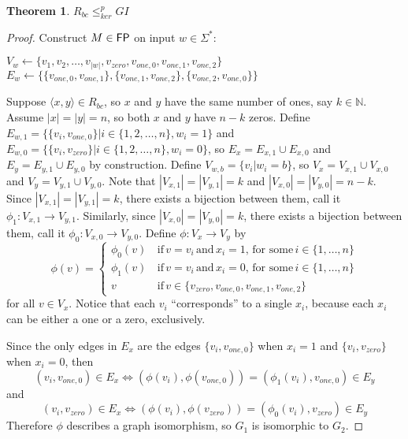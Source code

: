 \documentclass{article}
\newtheorem{theorem}{Theorem}[section]
\theoremstyle{definition} \newtheorem{definition}[definition]{Definition}
\newcommand{\plain}[1]{\,\text{#1}\,} %
\newcommand{\sigmastar}{\Sigma^{*}} %
\newcommand{\kr}{\leq^{p}_{ker}} %
\newcommand{\pair}[2]{\langle#1,#2\rangle} %
\begin{document}
\begin{theorem}\label{thm:rbc_gi}$R_{bc}\kr GI$\end{theorem}
\begin{proof}
  Construct $M\in {\ensuremath{\mathsf{FP}}}$ on input $w \in \sigmastar$:\\
  \begin{algorithm}[H]
    $V_w\gets\{v_1, v_2, \ldots, v_{|w|}, v_{zero}, v_{one,0}, v_{one,1},
    v_{one,2}\}$\;
    $E_w\gets\{\{v_{one,0}, v_{one,1}\}, \{v_{one,1}, v_{one,2}\}, \{v_{one,2},
    v_{one,0}\}\}$\; 
  \end{algorithm}
  
  Suppose $\pair{x}{y}\in R_{bc}$, so $x$ and $y$ have the same number of ones,
  say $k\in\mathbb{N}$. Assume $|x|=|y|=n$, so both $x$ and $y$ have $n-k$
  zeros. Define $E_{w,1}=\{\{v_i, v_{one,0}\}|i\in\{1,2,\ldots,n\}, w_i = 1\}$
  and $E_{w,0}=\{\{v_i, v_{zero}\}|i\in\{1,2,\ldots,n\}, w_i = 0\}$, so $E_x =
  E_{x,1}\cup E_{x,0}$ and $E_y = E_{y,1} \cup E_{y,0}$ by construction. Define
  $V_{w,b}=\{v_i|w_i=b\}$, so $V_x=V_{x,1} \cup V_{x,0}$ and $V_y=V_{y,1} \cup
  V_{y,0}$. Note that $|V_{x,1}|=|V_{y,1}|=k$ and
  $|V_{x,0}|=|V_{y,0}|=n-k$. Since $|V_{x,1}|=|V_{y,1}|=k$, there exists a
  bijection between them, call it $\phi_1\colon V_{x,1}\to V_{y,1}$. Similarly,
  since $|V_{x,0}|=|V_{y,0}|=k$, there exists a bijection between them, call it
  $\phi_0\colon V_{x,0}\to V_{y,0}$. Define $\phi\colon V_x\to V_y$ by
  \begin{displaymath}
    \phi(v) = 
    \begin{cases}
      \phi_0(v) & \plain{if} v = v_i \plain{and} x_i = 1, \plain{for some}
      i\in\{1,\ldots,n\}\\ 
      \phi_1(v) & \plain{if} v = v_i \plain{and} x_i = 0, \plain{for some}
      i\in\{1,\ldots,n\}\\ 
      v & \plain{if} v \in \{v_{zero}, v_{one,0}, v_{one,1}, v_{one,2}\}
    \end{cases}
  \end{displaymath}
  for all $v\in V_x$. Notice that each $v_i$ ``corresponds'' to a
  single $x_i$, because each $x_i$ can be either a one or a zero,
  exclusively.

  Since the only edges in $E_x$ are the edges $\{v_i, v_{one,0}\}$ when $x_i=1$
  and $\{v_i, v_{zero}\}$ when $x_i=0$, then
  \begin{displaymath}
    (v_i, v_{one,0})\in E_x \iff (\phi(v_i), \phi(v_{one,0}))=(\phi_1(v_i),
    v_{one,0})\in E_y
  \end{displaymath}
  and 
  \begin{displaymath}
    (v_i, v_{zero})\in E_x \iff (\phi(v_i), \phi(v_{zero})) = (\phi_0(v_i),
    v_{zero})\in E_y
  \end{displaymath}
  Therefore $\phi$ describes a graph isomorphism, so $G_1$ is isomorphic to
  $G_2$.
  

\end{proof}
\end{document}
